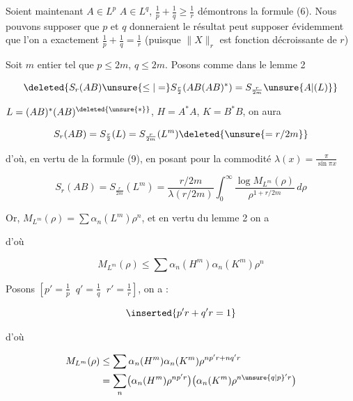 Soient maintenant  $A\in L^p$ $A\in L^q$, $\frac1p+\frac1q\geq\frac1r$ démontrons la formule (6). Nous pouvons supposer  que $p$ et $q$    donneraient le résultat   peut supposer évidemment  que l'on a exactement $\frac1p+\frac1q=\frac1r$ (puisque $\|X\|_r$ est fonction décroissante de $r$)

Soit $m$  entier tel que $p\leq 2m$, $q\leq 2m$.  Posons comme dans le lemme 2


\[
\deleted{S_r(AB)\unsure{\leq|=} S_{\frac r2}(AB(AB)^*)=S_{\frac r{2m}}\unsure{A|(L)}}
\]

$L=(AB)^*(AB)^{\deleted{\unsure{*}}}$, $H=A^*A$, $K=B^*B$, on aura

\[
S_r(AB)=S_{\frac r2}(L)=S_{\frac r{2m}}(L^m)\deleted{\unsure{=r/2m}}
\]

d'où, en vertu de la formule (9), en posant pour la commodité $\lambda(x)=\frac{\pi}{\sin\pi x}$

\[
S_r(AB)=S_{\frac r{2m}}(L^m)=\frac{r/2m}{\lambda(r/2m)}
\int_0^\infty\frac{\log M_{L^m}(\rho)}{\rho^{1+r/2m}}\,d\rho \tag*{(11)}
\]

 Or, $M_{L^m}(\rho)=\sum\alpha_n(L^m)\rho^n$, et   en vertu du lemme 2 on a 


d'où

\[
M_{L^m}(\rho)\leq\sum\alpha_n(H^m)\alpha_n(K^m)\rho^n
\]

Posons $\left[p'=\frac1p\;\;q'=\frac1q\;\;r'=\frac1r\right]$, on a : 

\[
\inserted{p'r+q'r=1}
\]

d'où

\[
\begin{aligned}
M_{L^m}(\rho)&\leq\sum\alpha_n(H^m)\alpha_n(K^m)\rho^{np'r+nq'r}\\
&=\sum_n\bigl(\alpha_n(H^m)\rho^{np'r}\bigr)
\bigl(\alpha_n(K^m)\rho^{n{\unsure{q|p}}'r}\bigr)
\end{aligned}
\]
